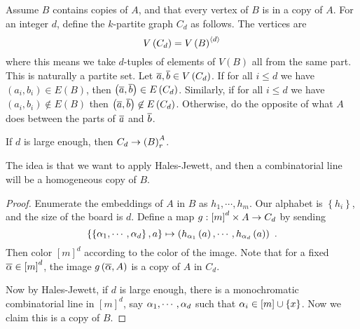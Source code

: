 \documentclass{amsart}
\begin{document}
\begin{Proof}
Assume $B$ contains copies of $A$, and that every vertex of $B$ is in a copy of $A$.
For an integer $d$, define the $k$-partite graph $C_d$ as follows. The vertices are
\begin{equation}
V\left( C_d \right) = V\left( B \right)^{\left\langle d \right\rangle}
\end{equation}
where this means we take $d$-tuples of elements of $V\left( B \right)$ all from the same
part. This is naturally a partite set.
Let $\overline{a},\overline{b}\in V\left( C_d \right)$. If for all $i\leq d$ we have
$\left( a_i , b_i \right)\in E\left( B \right)$, then $\left( \overline{a} , \overline{b}
\right)\in E\left( C_d \right)$. Similarly, if for all $i\leq d$ we have $\left( a_i ,
b_i\right)\not\in E\left( B \right)$ then $\left( \overline{a} , \overline{b} \right)\not\in
E\left( C_d \right)$. Otherwise, do the opposite of what $A$ does between the parts of
$\overline{a}$ and $\overline{b}$.
\begin{clm}
If $d$ is large enough, then $C_d\rightarrow \left( B \right)_r^A$.
\end{clm}
The idea is that we want to apply Hales-Jewett, and then a combinatorial line will be a
homogeneous copy of $B$. 
\begin{proof}
Enumerate the embeddings of $A$ in $B$ as $h_1 , \cdots , h_m$.
Our alphabet is $\left\{ h_i \right\}$, and the size of the board is $d$.
Define a map $g: \left[ m \right]^d \times A \rightarrow C_d$ by sending
\begin{equation}
\left\{ \left\{ \alpha_1 , \cdots , \alpha_d\right\},a\right\}
\mapsto \left( h_{\alpha_1}\left( a \right) , \cdots , h_{\alpha_d}\left( a \right) \right) \ .
\end{equation}
Then color $\left[ m \right]^d$ according to the color of the image.
Note that for a fixed $\overline{\alpha}\in \left[ m \right]^d$, the image $g\left( \overline{\alpha}
, A\right)$ is a copy of $A$ in $C_d$.

Now by Hales-Jewett, if $d$ is large enough, there is a monochromatic combinatorial line
in $\left[ m \right]^d$, say $\alpha_1 , \cdots , \alpha_d$ such that $\alpha_i\in \left[ m \right]\cup
\left\{ x \right\}$. Now we claim this is a copy of $B$.


\end{proof}
\end{Proof}
\end{document}
